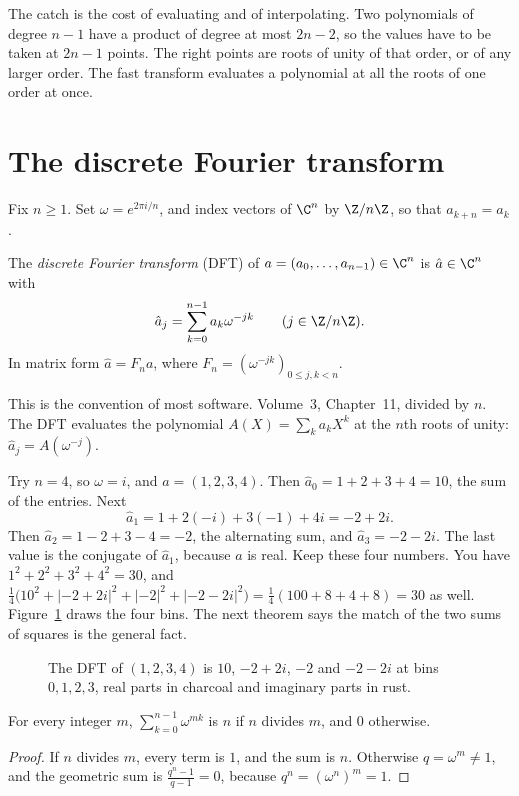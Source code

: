 The catch is the cost of evaluating and of interpolating. Two polynomials of degree $n-1$ have a product of degree at most $2n-2$, so the values have to be taken at $2n-1$ points. The right points are roots of unity of that order, or of any larger order. The fast transform evaluates a polynomial at all the roots of one order at once.

\section{The discrete Fourier transform}

Fix $n\ge1$. Set $\omega=e^{2\pi i/n}$, and index vectors of $\C^n$ by $\Z/n\Z$, so that $a_{k+n}=a_k$.

\begin{definition}
The \emph{discrete Fourier transform} (DFT) of $a=(a_0,\dots,a_{n-1})\in\C^n$ is $\hat a\in\C^n$ with
\[
\hat a_j=\sum_{k=0}^{n-1}a_k\omega^{-jk}\qquad(j\in\Z/n\Z).
\]
In matrix form $\hat a=F_na$, where $F_n=(\omega^{-jk})_{0\le j,k<n}$.
\end{definition}

This is the convention of most software. Volume~3, Chapter~11, divided by $n$. The DFT evaluates the polynomial $A(X)=\sum_ka_kX^k$ at the $n$th roots of unity: $\hat a_j=A(\omega^{-j})$.

Try $n=4$, so $\omega=i$, and $a=(1,2,3,4)$. Then $\hat a_0=1+2+3+4=10$, the sum of the entries. Next
\[
\hat a_1=1+2(-i)+3(-1)+4i=-2+2i.
\]
Then $\hat a_2=1-2+3-4=-2$, the alternating sum, and $\hat a_3=-2-2i$. The last value is the conjugate of $\hat a_1$, because $a$ is real. Keep these four numbers. You have $1^2+2^2+3^2+4^2=30$, and $\frac14\bigl(10^2+|-2+2i|^2+|-2|^2+|-2-2i|^2\bigr)=\frac14(100+8+4+8)=30$ as well. Figure~\ref{fig:rw07-dft} draws the four bins. The next theorem says the match of the two sums of squares is the general fact.

\begin{figure}[ht]
\centering
{}
\caption{The DFT of $(1,2,3,4)$ is $10$, $-2+2i$, $-2$ and $-2-2i$ at bins $0,1,2,3$, real parts in charcoal and imaginary parts in rust.}
\label{fig:rw07-dft}
\end{figure}

\begin{lemma}\label{lem:rootsum}
For every integer $m$, $\sum_{k=0}^{n-1}\omega^{mk}$ is $n$ if $n$ divides $m$, and $0$ otherwise.
\end{lemma}
\begin{proof}
If $n$ divides $m$, every term is $1$, and the sum is $n$. Otherwise $q=\omega^m\ne1$, and the geometric sum is $\frac{q^n-1}{q-1}=0$, because $q^n=(\omega^n)^m=1$.
\end{proof}

